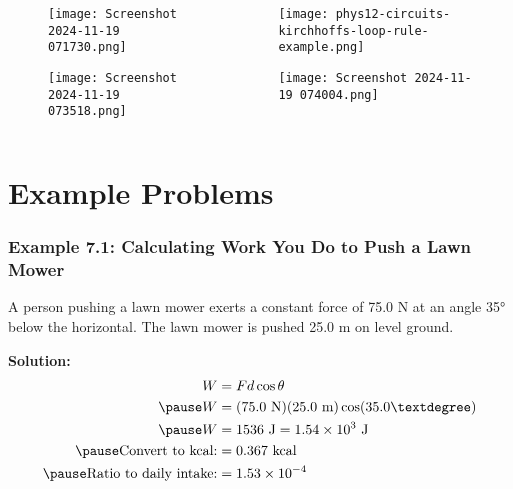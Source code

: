 \documentclass{beamer}
\begin{document}
\begin{frame}
\begin{columns}[T]
    \begin{column}{0.5\textwidth}
        \begin{figure}
            \centering
            \texttt{[image: Screenshot 2024-11-19 071730.png]}
        \end{figure}
        \begin{figure}
            \centering
            \texttt{[image: Screenshot 2024-11-19 073518.png]}
        \end{figure}
    \end{column}
    
    \begin{column}{0.5\textwidth}
        \begin{figure}
            \centering
            \texttt{[image: phys12-circuits-kirchhoffs-loop-rule-example.png]}
        \end{figure}
        \begin{figure}
            \centering
            \texttt{[image: Screenshot 2024-11-19 074004.png]}
        \end{figure}
    \end{column}
\end{columns}
\end{frame}

\section{Example Problems}

\begin{frame}
\frametitle{Example 7.1: Calculating Work You Do to Push a Lawn Mower}
A person pushing a lawn mower exerts a constant force of 75.0 N at an angle 35° below the horizontal. The lawn mower is pushed 25.0 m on level ground.
\vspace{0.5cm}
\end{frame}

\begin{frame}
\textbf{Solution:}
\begin{align*}
W &= Fd\cos\theta \\
\pause
W &= (75.0\text{ N})(25.0\text{ m})\cos(35.0°) \\
\pause
W &= 1536\text{ J} = 1.54 \times 10^3\text{ J} \\
\pause
\text{Convert to kcal:} &= 0.367\text{ kcal} \\
\pause
\text{Ratio to daily intake:} &= 1.53 \times 10^{-4}
\end{align*}
\end{frame}
\end{document}
